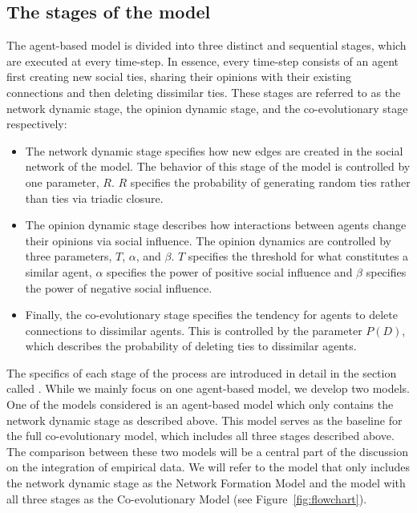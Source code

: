 \documentclass[11pt]{article}
\begin{document}
\subsection{The stages of the model}
The agent-based model is divided into three distinct and sequential stages, which are executed at every time-step.
In essence, every time-step consists of an agent first creating new social ties, sharing their opinions with their existing connections and then deleting dissimilar ties.
These stages are referred to as the network dynamic stage, the opinion dynamic stage, and the co-evolutionary stage respectively: 

\begin{itemize}
    \item The network dynamic stage specifies how new edges are created in the social network of the model. The behavior of this stage of the model is controlled by one parameter, $R$. $R$ specifies the probability of generating random ties rather than ties via triadic closure.
    \item The opinion dynamic stage describes how interactions between agents change their opinions via social influence. The opinion dynamics are controlled by three parameters, $T$, $\alpha$, and $\beta$. $T$ specifies the threshold for what constitutes a similar agent, $\alpha$ specifies the power of positive social influence and $\beta$ specifies the power of negative social influence.
    \item Finally, the co-evolutionary stage specifies the tendency for agents to delete connections to dissimilar agents. This is controlled by the parameter $P(D)$, which describes the probability of deleting ties to dissimilar agents.
\end{itemize}

\noindent The specifics of each stage of the process are introduced in detail in the section called \textit{}. While we mainly focus on one agent-based model, we develop two models. 
One of the models considered is an agent-based model which only contains the network dynamic stage as described above. This model serves as the baseline for the full co-evolutionary model, which includes all three stages described above. The comparison between these two models will be a central part of the discussion on the integration of empirical data. We will refer to the model that only includes the network dynamic stage as the Network Formation Model and the model with all three stages as the Co-evolutionary Model (see Figure~\ref{fig:flowchart}).
\end{document}
